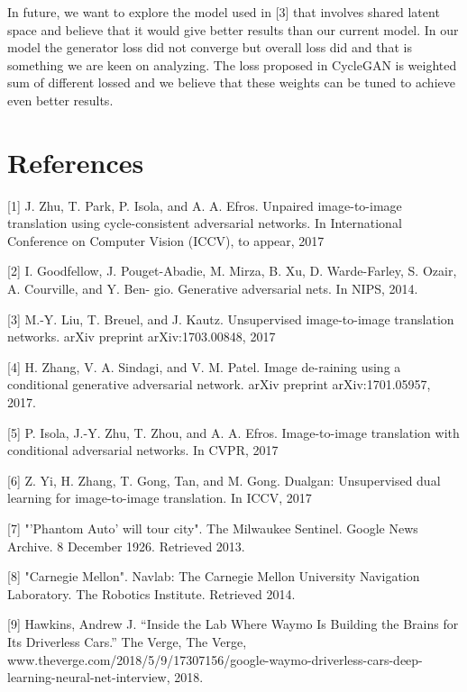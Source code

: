 \documentclass{article}
\begin{document}
In future, we want to explore the model used in [3] that involves shared latent space and believe that it would give better results than our current model. In our model the generator loss did not converge but overall loss did and that is something we are keen on analyzing. The loss proposed in CycleGAN is weighted sum of different lossed and we believe that these weights can be tuned to achieve even better results.


\section*{References}

\small
\label{[1]}[1] J. Zhu, T. Park, P. Isola, and A. A. Efros. Unpaired image-to-image 
translation using cycle-consistent adversarial networks. 
In International Conference on Computer Vision (ICCV), to appear, 2017

\label{[2]}[2] I. Goodfellow, J. Pouget-Abadie, M. Mirza, B. Xu, D. Warde-Farley, 
S. Ozair, A. Courville, and Y. Ben- gio. Generative adversarial nets. 
In NIPS, 2014.

\label{[3]}[3] M.-Y. Liu, T. Breuel, and J. Kautz. Unsupervised 
image-to-image translation networks. arXiv preprint arXiv:1703.00848, 2017

\label{[4]}[4] H. Zhang, V. A. Sindagi, and V. M. Patel. Image de-raining using a conditional generative 
adversarial network. arXiv preprint arXiv:1701.05957, 2017.

\label{[5]}[5] P. Isola, J.-Y. Zhu, T. Zhou, and A. A. Efros. 
Image-to-image translation with conditional adversarial networks. 
In CVPR, 2017

\label{[6]}[6] Z. Yi, H. Zhang, T. Gong, Tan, and M. Gong. Dualgan: 
Unsupervised dual learning for image-to-image translation. 
In ICCV, 2017

\label{[7]}[7] "'Phantom Auto' will tour city". The Milwaukee Sentinel. 
Google News Archive. 8 December 1926. Retrieved 2013.

\label{[8]}[8] "Carnegie Mellon". Navlab: The Carnegie Mellon University Navigation Laboratory. 
The Robotics Institute. Retrieved 2014.

\label{[9]}[9] Hawkins, Andrew J. “Inside the Lab Where Waymo Is Building 
the Brains for Its Driverless Cars.” The Verge, The Verge, 
www.theverge.com/2018/5/9/17307156/google-waymo-driverless-cars-deep-learning-neural-net-interview, 2018.


\end{document}

